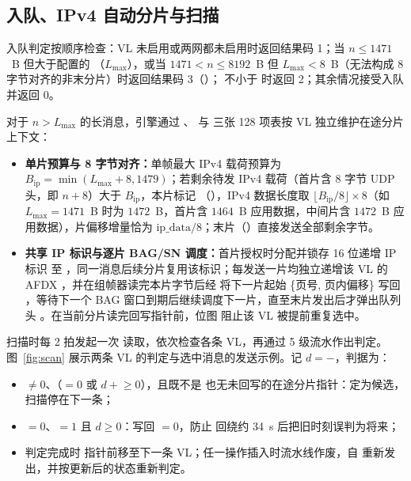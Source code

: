 \FloatBarrier
\subsection{入队、IPv4 自动分片与扫描}

入队判定按顺序检查：VL 未启用或两网都未启用时返回结果码 1；当 $n\le 1471$~B 但大于配置的 （$L_\text{max}$），或当 $1471 < n \le 8192$~B 但 $L_\text{max}<8$~B（无法构成 8 字节对齐的非末分片）时返回结果码 3（）； 不小于  时返回 2；其余情况接受入队并返回 0。

对于 $n > L_\text{max}$ 的长消息，引擎通过 、 与  三张 128 项表按 VL 独立维护在途分片上下文：
\begin{itemize}[leftmargin=2em,itemsep=1pt]
  \item \textbf{单片预算与 8 字节对齐：}单帧最大 IPv4 载荷预算为 $B_\text{ip} = \min(L_\text{max}+8, 1479)$；若剩余待发 IPv4 载荷（首片含 8 字节 UDP 头，即 $n+8$）大于 $B_\text{ip}$，本片标记 （），IPv4 数据长度取 $\lfloor B_\text{ip}/8 \rfloor \times 8$（如 $L_\text{max}=1471$~B 时为 $1472$~B，首片含 $1464$~B 应用数据，中间片含 $1472$~B 应用数据），片偏移增量恰为 $\text{ip\_data}/8$；末片（）直接发送全部剩余字节。
  \item \textbf{共享 IP 标识与逐片 BAG/SN 调度：}首片授权时分配并锁存 16 位递增 IP 标识  至 ，同一消息后续分片复用该标识；每发送一片均独立递增该 VL 的 AFDX ，并在组帧器读完本片字节后经  将下一片起始 \{页号, 页内偏移\} 写回 ，等待下一个 BAG 窗口到期后继续调度下一片，直至末片发出后才弹出队列头 。在当前分片读完回写指针前，位图  阻止该 VL 被提前重复选中。
\end{itemize}

扫描时每 2 拍发起一次  读取，依次检查各条 VL，再通过 5 级流水作出判定。图~\ref{fig:scan} 展示两条 VL 的判定与选中消息的发送示例。记 $d=$$-$，判据为：
\begin{itemize}
  \item {}$\ne 0$、（$=0$ 或 $d+$$\ge 0$），且既不是  也无未回写的在途分片指针：定为候选，扫描停在下一条；
  \item {}$=0$、$=1$ 且 $d\ge 0$：写回 $=0$，防止  回绕约 34~s 后把旧时刻误判为将来；
  \item 判定完成时  指针前移至下一条 VL；任一操作插入时流水线作废，自  重新发出，并按更新后的状态重新判定。
\end{itemize}

